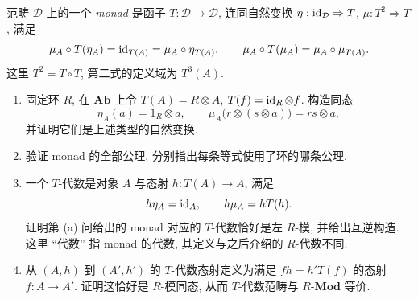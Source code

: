 \documentclass{article}
\begin{document}
\begin{problem}
范畴 $\mathcal D$ 上的一个 \emph{monad} 是函子 $T:\mathcal D\to\mathcal D$, 连同自然变换 $\eta:\operatorname{id}_{\mathcal D}\Rightarrow T$, $\mu:T^2\Rightarrow T$, 满足
\[
  \mu_A\circ T(\eta_A)=\operatorname{id}_{T(A)}=\mu_A\circ\eta_{T(A)},\qquad
  \mu_A\circ T(\mu_A)=\mu_A\circ\mu_{T(A)}.
\]
这里 $T^2=T\circ T$, 第二式的定义域为 $T^3(A)$.
\begin{enumerate}
  \item[(a)] 固定环 $R$, 在 $\mathbf{Ab}$ 上令 $T(A)=R\otimes A$, $T(f)=\operatorname{id}_R\otimes f$. 构造同态
  \[
    \eta_A(a)=1_R\otimes a,\qquad
    \mu_A\bigl(r\otimes(s\otimes a)\bigr)=rs\otimes a,
  \]
  并证明它们是上述类型的自然变换.
  \item[(b)] 验证 monad 的全部公理, 分别指出每条等式使用了环的哪条公理.
  \item[(c)] 一个 $T$-代数是对象 $A$ 与态射 $h:T(A)\to A$, 满足
  \[
    h\eta_A=\operatorname{id}_A,\qquad h\mu_A=hT(h).
  \]
  证明第 (a) 问给出的 monad 对应的 $T$-代数恰好是左 $R$-模, 并给出互逆构造. 这里 ``代数'' 指 monad 的代数, 其定义与之后介绍的 $R$-代数不同.
  \item[(d)] 从 $(A,h)$ 到 $(A',h')$ 的 $T$-代数态射定义为满足 $fh=h'T(f)$ 的态射 $f:A\to A'$. 证明这恰好是 $R$-模同态, 从而 $T$-代数范畴与 $R$-$\mathbf{Mod}$ 等价.
\end{enumerate}
\end{problem}
\end{document}
